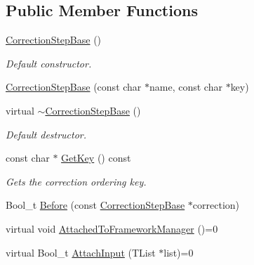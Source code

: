 \subsection*{Public Member Functions}
\begin{DoxyCompactItemize}
\item 
\mbox{\label{classQn_1_1CorrectionStepBase_a01efab7c6bf51cc06e69f726518ccdd4}} 
\mbox{\hyperlink{classQn_1_1CorrectionStepBase_a01efab7c6bf51cc06e69f726518ccdd4}{Correction\+Step\+Base}} ()
\begin{DoxyCompactList}\small\item\em Default constructor. \end{DoxyCompactList}\item 
\mbox{\hyperlink{classQn_1_1CorrectionStepBase_a8e3446b2def1be06c0af8278f8bf2602}{Correction\+Step\+Base}} (const char $\ast$name, const char $\ast$key)
\item 
\mbox{\label{classQn_1_1CorrectionStepBase_aa646a0974dc245720e0cae0d7c4a6b9f}} 
virtual \mbox{\hyperlink{classQn_1_1CorrectionStepBase_aa646a0974dc245720e0cae0d7c4a6b9f}{$\sim$\+Correction\+Step\+Base}} ()
\begin{DoxyCompactList}\small\item\em Default destructor. \end{DoxyCompactList}\item 
\mbox{\label{classQn_1_1CorrectionStepBase_a29606bfd3e57614ff065937c3e4e1945}} 
const char $\ast$ \mbox{\hyperlink{classQn_1_1CorrectionStepBase_a29606bfd3e57614ff065937c3e4e1945}{Get\+Key}} () const
\begin{DoxyCompactList}\small\item\em Gets the correction ordering key. \end{DoxyCompactList}\item 
Bool\+\_\+t \mbox{\hyperlink{classQn_1_1CorrectionStepBase_aad04f26aeb59df7735255afa10ac931e}{Before}} (const \mbox{\hyperlink{classQn_1_1CorrectionStepBase}{Correction\+Step\+Base}} $\ast$correction)
\item 
virtual void \mbox{\hyperlink{classQn_1_1CorrectionStepBase_a0c255ad7095cd2aa89fcf1f1db068949}{Attached\+To\+Framework\+Manager}} ()=0
\item 
virtual Bool\+\_\+t \mbox{\hyperlink{classQn_1_1CorrectionStepBase_aa778d3926bb1ee463753466f2216187d}{Attach\+Input}} (T\+List $\ast$list)=0

\end{DoxyCompactItemize}
